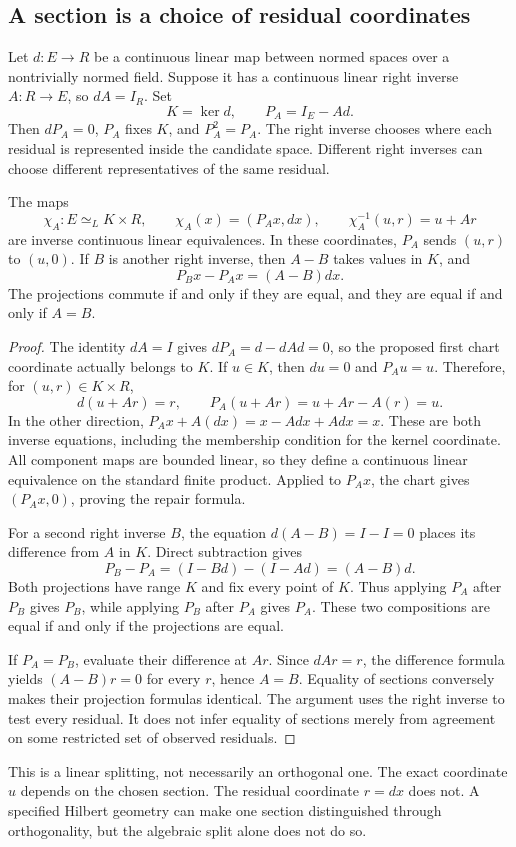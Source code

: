 \subsection{A section is a choice of residual coordinates}
Let \(d:E\to R\) be a continuous linear map between normed spaces over a nontrivially normed field. Suppose it has a continuous linear right inverse \(A:R\to E\), so \(dA=I_R\). Set
\[
 K=\ker d,\qquad P_A=I_E-Ad.
\]
Then \(dP_A=0\), \(P_A\) fixes \(K\), and \(P_A^2=P_A\). The right inverse chooses where each residual is represented inside the candidate space. Different right inverses can choose different representatives of the same residual.

\begin{KStheorem}\label{KS:KS65}
The maps
\[
 \chi_A:E\simeq_L K\times R,\qquad
 \chi_A(x)=(P_Ax,dx),\qquad
 \chi_A^{-1}(u,r)=u+Ar
\]
are inverse continuous linear equivalences. In these coordinates, \(P_A\) sends \((u,r)\) to \((u,0)\). If \(B\) is another right inverse, then \(A-B\) takes values in \(K\), and
\[
 P_Bx-P_Ax=(A-B)dx.
\]
The projections commute if and only if they are equal, and they are equal if and only if \(A=B\).
\end{KStheorem}
\begin{proof}
The identity \(dA=I\) gives \(dP_A=d-dAd=0\), so the proposed first chart coordinate actually belongs to \(K\). If \(u\in K\), then \(du=0\) and \(P_Au=u\). Therefore, for \((u,r)\in K\times R\),
\[
 d(u+Ar)=r,\qquad P_A(u+Ar)=u+Ar-A(r)=u.
\]
In the other direction, \(P_Ax+A(dx)=x-Adx+Adx=x\). These are both inverse equations, including the membership condition for the kernel coordinate. All component maps are bounded linear, so they define a continuous linear equivalence on the standard finite product. Applied to \(P_Ax\), the chart gives \((P_Ax,0)\), proving the repair formula.

For a second right inverse \(B\), the equation \(d(A-B)=I-I=0\) places its difference from \(A\) in \(K\). Direct subtraction gives
\[
 P_B-P_A=(I-Bd)-(I-Ad)=(A-B)d.
\]
Both projections have range \(K\) and fix every point of \(K\). Thus applying \(P_A\) after \(P_B\) gives \(P_B\), while applying \(P_B\) after \(P_A\) gives \(P_A\). These two compositions are equal if and only if the projections are equal.

If \(P_A=P_B\), evaluate their difference at \(Ar\). Since \(dAr=r\), the difference formula yields \((A-B)r=0\) for every \(r\), hence \(A=B\). Equality of sections conversely makes their projection formulas identical. The argument uses the right inverse to test every residual. It does not infer equality of sections merely from agreement on some restricted set of observed residuals.
\end{proof}
This is a linear splitting, not necessarily an orthogonal one. The exact coordinate \(u\) depends on the chosen section. The residual coordinate \(r=dx\) does not. A specified Hilbert geometry can make one section distinguished through orthogonality, but the algebraic split alone does not do so.

